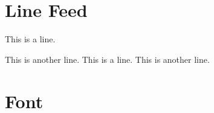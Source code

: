 \documentclass{article}
\begin{document}
    \section{Line Feed}
        This is a line. 

        This is another line. \newline
        This is a line. \newline
        This is another line. 
        
    \section{Font}
\end{document}
